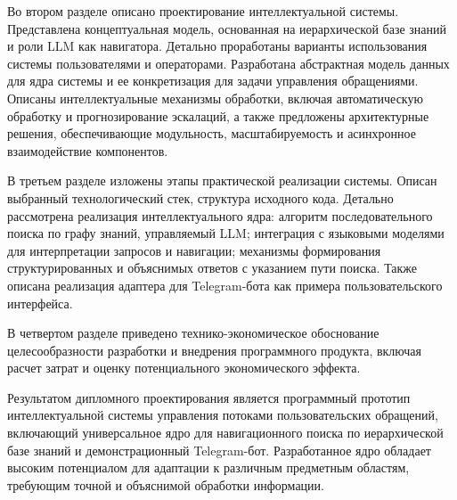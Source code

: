 Во втором разделе описано проектирование интеллектуальной системы. Представлена концептуальная модель, основанная на иерархической базе знаний и роли LLM как навигатора. Детально проработаны варианты использования системы пользователями и операторами. Разработана абстрактная модель данных для ядра системы и ее конкретизация для задачи управления обращениями. Описаны интеллектуальные механизмы обработки, включая автоматическую обработку и прогнозирование эскалаций, а также предложены архитектурные решения, обеспечивающие модульность, масштабируемость и асинхронное взаимодействие компонентов.

В третьем разделе изложены этапы практической реализации системы. Описан выбранный технологический стек, структура исходного кода. Детально рассмотрена реализация интеллектуального ядра: алгоритм последовательного поиска по графу знаний, управляемый LLM; интеграция с языковыми моделями для интерпретации запросов и навигации; механизмы формирования структурированных и объяснимых ответов с указанием пути поиска. Также описана реализация адаптера для Telegram-бота как примера пользовательского интерфейса.

В четвертом разделе приведено технико-экономическое обоснование целесообразности разработки и внедрения программного продукта, включая расчет затрат и оценку потенциального экономического эффекта.

Результатом дипломного проектирования является программный прототип интеллектуальной системы управления потоками пользовательских обращений, включающий универсальное ядро для навигационного поиска по иерархической базе знаний и демонстрационный Telegram-бот. Разработанное ядро обладает высоким потенциалом для адаптации к различным предметным областям, требующим точной и объяснимой обработки информации.

\clearpage